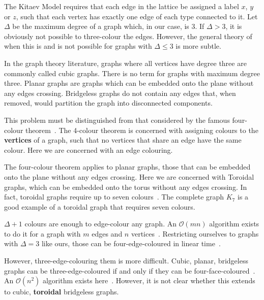 The Kitaev Model requires that each edge in the lattice be assigned a label \(x\), \(y\) or \(z\), such that each vertex has exactly one edge of each type connected to it. Let \(\Delta\) be the maximum degree of a graph which, in our case, is 3. If \(\Delta > 3\), it is obviously not possible to three-colour the edges. However, the general theory of when this is and is not possible for graphs with \(\Delta \leq 3\) is more subtle.

In the graph theory literature, graphs where all vertices have degree three are commonly called cubic graphs. There is no term for graphs with maximum degree three. Planar graphs are graphs which can be embedded onto the plane without any edges crossing. Bridgeless graphs do not contain any edges that, when removed, would partition the graph into disconnected components.

This problem must be distinguished from that considered by the famous four-colour theorem~\autocite{appelEveryPlanarMap1989}. The 4-colour theorem is concerned with assigning colours to the \textbf{vertices} of a graph, such that no vertices that share an edge have the same colour. Here we are concerned with an edge colouring.

The four-colour theorem applies to planar graphs, those that can be embedded onto the plane without any edges crossing. Here we are concerned with Toroidal graphs, which can be embedded onto the torus without any edges crossing. In fact, toroidal graphs require up to seven colours~\autocite{heawoodMapColouringTheorems}. The complete graph \(K_7\) is a good example of a toroidal graph that requires seven colours.

\(\Delta + 1\) colours are enough to edge-colour any graph. An \(\mathcal{O}(mn)\) algorithm exists to do it for a graph with \(m\) edges and \(n\) vertices~\autocite{gEstimateChromaticClass1964}. Restricting ourselves to graphs with \(\Delta = 3\) like ours, those can be four-edge-coloured in linear time~\autocite{skulrattanakulchai4edgecoloringGraphsMaximum2002}.

However, three-edge-colouring them is more difficult. Cubic, planar, bridgeless graphs can be three-edge-coloured if and only if they can be four-face-coloured~\autocite{tait1880remarks}. An \(\mathcal{O}(n^2)\) algorithm exists here~\autocite{robertson1996efficiently}. However, it is not clear whether this extends to cubic, \textbf{toroidal} bridgeless graphs.

